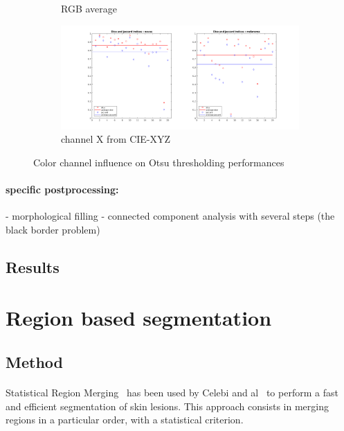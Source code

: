 \documentclass[a4paper,10pt]{article}
\begin{document}
\begin{figure}
\begin{subfigure}{0.7\textwidth}
		\caption{RGB average}
		\label{fig:otsu-mean}
	\end{subfigure}
	\begin{subfigure}{0.7\textwidth}
		\includegraphics[width=0.9\linewidth]{../results/color-channel-influence/base-evaluation/otsu-dice-jaccard-X.png}
		\caption{channel X from CIE-XYZ}
		\label{fig:otsu-X}
	\end{subfigure}
	
	\caption{Color channel influence on Otsu thresholding performances}
	\label{fig:color-channel-otsu}
\end{figure} 


\paragraph{specific postprocessing:}
- morphological filling
- connected component analysis with several steps (the black border problem)

\subsection{Results}

\section{Region based segmentation}
\subsection{Method}
\paragraph{} Statistical Region Merging~\cite{nock_statistical_2004} has been 
used by Celebi and al~\cite{celebi_border_2008} to perform a fast and efficient 
segmentation of skin lesions. This approach consists in merging regions in a particular order, with a statistical criterion.
\end{document}
